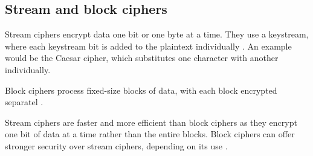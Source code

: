 \subsection{Stream and block ciphers}

Stream ciphers encrypt data one bit or one byte at a time.
They use a keystream, where each keystream bit is added to the plaintext individually \cite{Paar2024}.
An example would be the Caesar cipher, which substitutes one character with another individually.

Block ciphers process fixed-size blocks of data, with each block encrypted separatel \cite{Paar2024}.

Stream ciphers are faster and more efficient than block ciphers as they encrypt one bit of data at a time rather than the entire blocks. 
Block ciphers can offer stronger security over stream ciphers, depending on its use \cite{Paar2024}. 